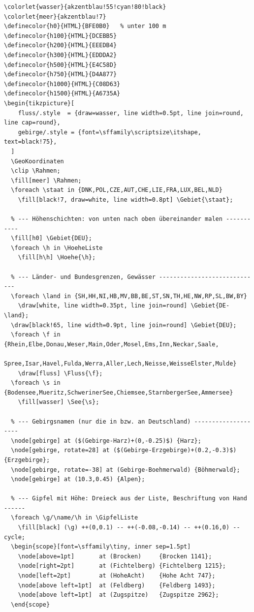 \begin{lstlisting}[style=latex]
% Präambel: 
\colorlet{wasser}{akzentblau!55!cyan!80!black}
\colorlet{meer}{akzentblau!7}
\definecolor{h0}{HTML}{BFE0B0}   % unter 100 m
\definecolor{h100}{HTML}{DCEBB5}
\definecolor{h200}{HTML}{EEEDB4}
\definecolor{h300}{HTML}{EDDDA2}
\definecolor{h500}{HTML}{E4C58D}
\definecolor{h750}{HTML}{D4A877}
\definecolor{h1000}{HTML}{C08D63}
\definecolor{h1500}{HTML}{A6735A}
\begin{tikzpicture}[
    fluss/.style  = {draw=wasser, line width=0.5pt, line join=round, line cap=round},
    gebirge/.style = {font=\sffamily\scriptsize\itshape, text=black!75},
  ]
  \GeoKoordinaten
  \clip \Rahmen;
  \fill[meer] \Rahmen;
  \foreach \staat in {DNK,POL,CZE,AUT,CHE,LIE,FRA,LUX,BEL,NLD}
    \fill[black!7, draw=white, line width=0.8pt] \Gebiet{\staat};

  % --- Höhenschichten: von unten nach oben übereinander malen -----------
  \fill[h0] \Gebiet{DEU};
  \foreach \h in \HoeheListe
    \fill[h\h] \Hoehe{\h};

  % --- Länder- und Bundesgrenzen, Gewässer -----------------------------
  \foreach \land in {SH,HH,NI,HB,MV,BB,BE,ST,SN,TH,HE,NW,RP,SL,BW,BY}
    \draw[white, line width=0.35pt, line join=round] \Gebiet{DE-\land};
  \draw[black!65, line width=0.9pt, line join=round] \Gebiet{DEU};
  \foreach \f in {Rhein,Elbe,Donau,Weser,Main,Oder,Mosel,Ems,Inn,Neckar,Saale,
                  Spree,Isar,Havel,Fulda,Werra,Aller,Lech,Neisse,WeisseElster,Mulde}
    \draw[fluss] \Fluss{\f};
  \foreach \s in {Bodensee,Mueritz,SchwerinerSee,Chiemsee,StarnbergerSee,Ammersee}
    \fill[wasser] \See{\s};

  % --- Gebirgsnamen (nur die in bzw. an Deutschland) --------------------
  \node[gebirge] at ($(Gebirge-Harz)+(0,-0.25)$) {Harz};
  \node[gebirge, rotate=28] at ($(Gebirge-Erzgebirge)+(0.2,-0.3)$) {Erzgebirge};
  \node[gebirge, rotate=-38] at (Gebirge-Boehmerwald) {Böhmerwald};
  \node[gebirge] at (10.3,0.45) {Alpen};

  % --- Gipfel mit Höhe: Dreieck aus der Liste, Beschriftung von Hand ------
  \foreach \g/\name/\h in \GipfelListe
    \fill[black] (\g) ++(0,0.1) -- ++(-0.08,-0.14) -- ++(0.16,0) -- cycle;
  \begin{scope}[font=\sffamily\tiny, inner sep=1.5pt]
    \node[above=1pt]       at (Brocken)     {Brocken 1141};
    \node[right=2pt]       at (Fichtelberg) {Fichtelberg 1215};
    \node[left=2pt]        at (HoheAcht)    {Hohe Acht 747};
    \node[above left=1pt]  at (Feldberg)    {Feldberg 1493};
    \node[above left=1pt]  at (Zugspitze)   {Zugspitze 2962};
  \end{scope}


\end{lstlisting}
